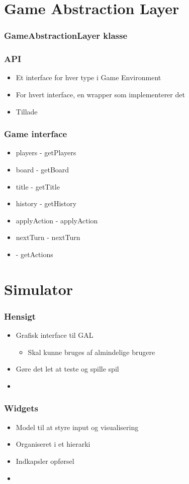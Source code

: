 \section{Game Abstraction Layer}


\begin{frame}
  \frametitle{GameAbstractionLayer klasse}

\end{frame}

\begin{frame}
  \frametitle{API}

  \begin{itemize}
    \item Et interface for hver type i Game Environment
    \item For hvert interface, en wrapper som implementerer det
    \item Tillade
  \end{itemize}
\end{frame}

\begin{frame}
  \frametitle{Game interface}

  \begin{itemize}
    \item players  - getPlayers
	 \item board	-	getBoard
	 \item title - getTitle
	 \item history - getHistory
	 \item applyAction - applyAction
	 \item nextTurn - nextTurn
	 \item  - getActions
  \end{itemize}
\end{frame}

\section{Simulator}

\begin{frame}
  \frametitle{Hensigt}

  \begin{itemize}
    \item Grafisk interface til GAL
	   \begin{itemize}
		  \item Skal kunne bruges af almindelige brugere
	   \end{itemize}
	 \item Gøre det let at teste og spille spil
	 \item 
  \end{itemize}
\end{frame}

\begin{frame}
  \frametitle{Widgets}

  \begin{itemize}
    \item Model til at styre input og visualisering
	 \item Organiseret i et hierarki
	 \item Indkapsler opførsel
	 \item 
  \end{itemize}
\end{frame}

